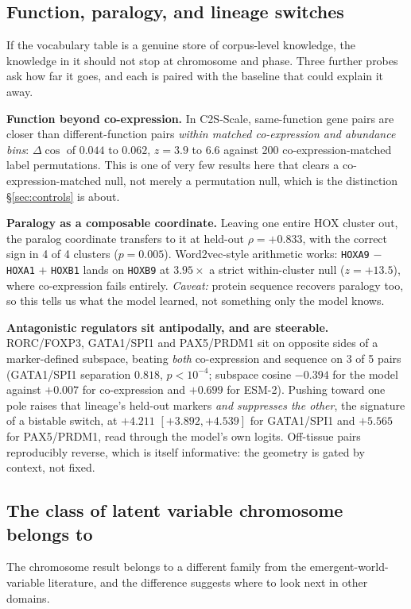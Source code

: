 \documentclass[11pt]{article}
\begin{document}
\subsection{Function, paralogy, and lineage switches}
If the vocabulary table is a genuine store of corpus-level knowledge, the knowledge in it should not
stop at chromosome and phase. Three further probes ask how far it goes, and each is paired with the
baseline that could explain it away.

\textbf{Function beyond co-expression.} In C2S-Scale, same-function gene pairs are closer than
different-function pairs \emph{within matched co-expression and abundance bins}: $\Delta\cos$ of
$0.044$ to $0.062$, $z=3.9$ to $6.6$ against 200 co-expression-matched label permutations. This is one
of very few results here that clears a co-expression-matched null, not merely a permutation null, which
is the distinction \S\ref{sec:controls} is about.

\textbf{Paralogy as a composable coordinate.} Leaving one entire HOX cluster out, the paralog
coordinate transfers to it at held-out $\rho=+0.833$, with the correct sign in 4 of 4 clusters
($p=0.005$). Word2vec-style arithmetic works: \texttt{HOXA9} $-$ \texttt{HOXA1} $+$ \texttt{HOXB1}
lands on \texttt{HOXB9} at $3.95\times$ a strict within-cluster null ($z=+13.5$), where co-expression
fails entirely. \emph{Caveat:} protein sequence recovers paralogy too, so this tells us what the model
learned, not something only the model knows.

\textbf{Antagonistic regulators sit antipodally, and are steerable.} RORC/FOXP3, GATA1/SPI1 and
PAX5/PRDM1 sit on opposite sides of a marker-defined subspace, beating \emph{both} co-expression and
sequence on 3 of 5 pairs (GATA1/SPI1 separation $0.818$, $p<10^{-4}$; subspace cosine $-0.394$ for the
model against $+0.007$ for co-expression and $+0.699$ for ESM-2). Pushing toward one pole raises that
lineage's held-out markers \emph{and suppresses the other}, the signature of a bistable switch, at
$+4.211$ $[+3.892,+4.539]$ for GATA1/SPI1 and $+5.565$ for PAX5/PRDM1, read through the model's own
logits. Off-tissue pairs reproducibly reverse, which is itself informative: the geometry is gated by
context, not fixed.

\subsection{The class of latent variable chromosome belongs to}
The chromosome result belongs to a different family from the emergent-world-variable literature, and
the difference suggests where to look next in other domains.
\end{document}
